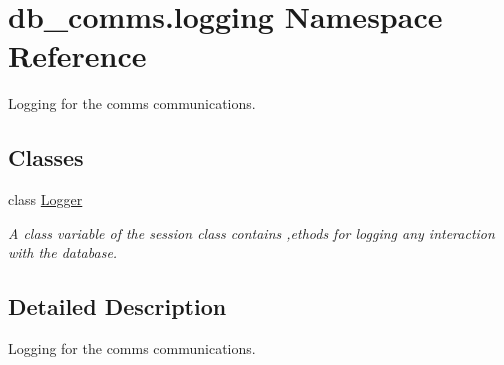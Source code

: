 \hypertarget{namespacedb__comms_1_1logging}{}\section{db\+\_\+comms.\+logging Namespace Reference}
\label{namespacedb__comms_1_1logging}


Logging for the comms communications.  


\subsection*{Classes}
\begin{DoxyCompactItemize}
\item 
class \hyperlink{classdb__comms_1_1logging_1_1_logger}{Logger}
\begin{DoxyCompactList}\small\item\em A class variable of the session class contains ,ethods for logging any interaction with the database. \end{DoxyCompactList}\end{DoxyCompactItemize}


\subsection{Detailed Description}
Logging for the comms communications. 

